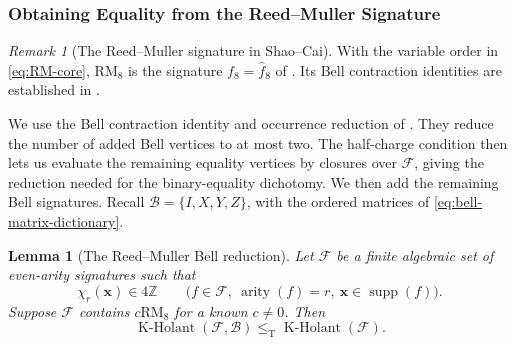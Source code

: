 \documentclass[11pt,letterpaper,onecolumn]{article}
\theoremstyle{plain}
\newtheorem{lemma}[lemma]{Lemma}
\theoremstyle{definition}
\theoremstyle{remark}
\newtheorem{remark}[remark]{Remark}
\newcommand{\cF}{\mathcal F}
\newcommand{\KHolant}{\operatorname{K\text{-}Holant}}
\newcommand{\supp}{\operatorname{supp}}
\newcommand{\arity}{\operatorname{arity}}
\newcommand{\RMcore}{\mathrm{RM}_8}
\newcommand{\leT}{\leq_{\mathrm T}}
\begin{document}
	\subsubsection{Obtaining Equality from the Reed--Muller Signature}
	
	\begin{remark}[The Reed--Muller signature in Shao--Cai]
		\label{rem:sc-f8-core}
		With the variable order in \cref{eq:RM-core}, \(\RMcore\) is
		the signature \(f_8=\widehat f_8\) of
		\cite[full version, Section~8]{ShaoCai2020}.  Its Bell contraction identities
		are established in \cite[conference version, Theorem~13 and the
			construction following it]{CaiFuShao2020Entanglement}.
	\end{remark}
	
	
	
    We use the Bell contraction identity and occurrence reduction of
    \cite[full version, Definition~8.7 and Lemma~8.9]{ShaoCai2020}.
    They reduce the number of added Bell vertices to at most two.
    The half-charge condition then lets us evaluate the remaining equality
    vertices by closures over \(\cF\), giving the reduction needed for the
    binary-equality dichotomy. We then add the remaining Bell signatures.
    Recall \(\mathcal B=\{I,X,Y,Z\}\), with the ordered matrices of
    \cref{eq:bell-matrix-dictionary}.
	
	\begin{lemma}[The Reed--Muller Bell reduction]
		\label{thm:q8-normalized-bell-lift}
		Let \(\cF\) be a finite algebraic set of even-arity signatures such that
		\[
		\chi_r({\mathbf x})\in4\mathbb Z
		\qquad
		\bigl(f\in\cF,\ \arity(f)=r,\ {\mathbf x}\in\supp(f)\bigr).
		\]
		Suppose \(\cF\) contains \(c\RMcore\) for a known \(c\ne0\).  Then
		\begin{equation}
		\KHolant(\cF,\mathcal B)\leT\KHolant(\cF).
		\label{eq:q8-relative-bell-reduction}
		\end{equation}
	\end{lemma}
	
\end{document}
